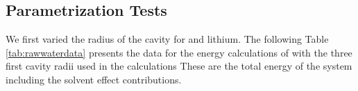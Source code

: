 \documentclass[../master_thesis.tex]{subfiles}
\begin{document}
\begin{table}[!htbp]
\caption[Reaction field energy for a point charge of $\epsinf = 80$]{Reaction field energy for a point charge of $q = 3$ and $\epsinf = 80$ calculated with differing precision, transition width ($\sigma$) and cavity radius (Bohr) compared to the values from the Born model}
\label{tab:Er80}
\end{table}

\clearpage


\subsection{Parametrization Tests}\label{sec:paratests}
We first varied the radius of the cavity for  and lithium. The following
Table \ref{tab:rawwaterdata}  presents the data for the energy
calculations of  with the three first cavity radii used in the calculations
These are the total  energy of the system including the solvent effect contributions.
\end{document}
